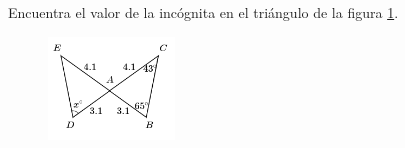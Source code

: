 \question[10]  Encuentra el valor de la incógnita en el triángulo de la figura \ref{fig:angle_triangle_16}.
\begin{figure}[H]
    \begin{center}
        \includegraphics[width=0.3\textwidth]{../images/angle_triangle_16.png}
    \end{center}
    \caption{}
    \label{fig:angle_triangle_16}
\end{figure}
